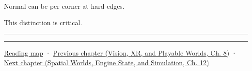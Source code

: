 Normal can be per-corner at hard edges.

This distinction is critical.

\begin{center}\rule{0.5\linewidth}{0.5pt}\end{center}

\begin{center}\rule{0.5\linewidth}{0.5pt}\end{center}

\hyperref[volume-reading-map]{Reading map} · \href{../07-Vision-XR-and-Playable-Worlds/main.pdf\#nameddest=04-visual-computing-ii-ch039-tiling-ordering-and-compositing-at-scale}{Previous chapter (Vision, XR, and Playable Worlds, Ch. 8)} · \href{../05-Spatial-Worlds-Engine-State-and-Simulation/main.pdf\#nameddest=04-visual-computing-ii-ch041-per-vertex-and-per-corner-mesh-attributes}{Next chapter (Spatial Worlds, Engine State, and Simulation, Ch. 12)}
